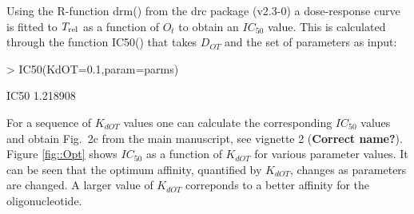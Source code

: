 \documentclass[a4paper,11pt]{article}
\newcommand{\Trel}{T_{\rm{rel}}}
\begin{document}
Using the R-function drm() from the drc package (v2.3-0) a dose-response curve is fitted to $\Trel$ as a function of $O_t$ to obtain an $IC_{50}$ value. This is calculated through the function IC50() that takes $D_{OT}$ and the set of parameters as input:
\begin{Schunk}
\begin{Sinput}
> IC50(KdOT=0.1,param=parms)
\end{Sinput}
\begin{Soutput}
    IC50 
1.218908 
\end{Soutput}
\end{Schunk}
 For a sequence of $K_{dOT}$ values one can calculate the corresponding $IC_{50}$ values and obtain Fig.~2c from the main manuscript, see vignette 2 (\textbf{Correct name?}). Figure \ref{fig::Opt} shows $IC_{50}$ as a function of $K_{dOT}$ for various parameter values. It can be seen that the optimum affinity, quantified by $K_{dOT}$, changes as parameters are changed. A larger value of $K_{dOT}$ correponds to a better affinity for the oligonucleotide.
%  
% 
%  
% 
\end{document}
